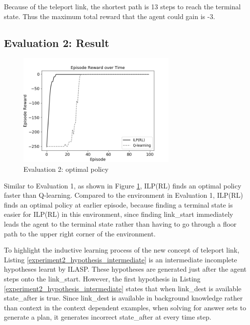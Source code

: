 Because of the teleport link, the shortest path is 13 steps to reach the terminal state. Thus the maximum total reward that the agent could gain is -3.

\subsection{Evaluation 2: Result}
\label{subsec:experiment2_result}
    
\begin{figure}[!htb]
\centering
\includegraphics[width=0.7\textwidth]{./figures/experiment2_test}
\caption{Evaluation 2: optimal policy}
\label{experiment2_training}
\end{figure}

Similar to Evaluation 1, as shown in Figure \ref{experiment2_training}, ILP(RL) finds an optimal policy faster than Q-learning. Compared to the environment in Evaluation 1, ILP(RL) finds an optimal policy at earlier episode, because finding a terminal state is easier for ILP(RL) in this environment, since finding \textsf{link\_start} immediately leads the agent to the terminal state rather than having to go through a floor path to the upper right corner of the environment.
\newpage


To highlight the inductive learning process of the new concept of teleport link, Listing \ref{experiment2_hypothesis_intermediate} is an intermediate incomplete hypotheses learnt by ILASP.
These hypotheses are generated just after the agent steps onto the \textsf{link\_start}. However, the first hypothesis in Listing \ref{experiment2_hypothesis_intermediate} states that
when \textsf{link\_dest} is available \textsf{state\_after} is true. Since \textsf{link\_dest} is available in background knowledge rather than context in the context dependent examples,
when solving for answer sets to generate a plan, it generates incorrect \textsf{state\_after} at every time step.

